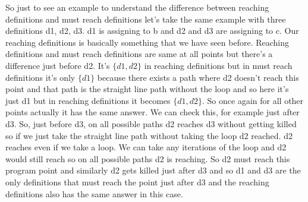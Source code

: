 \begin{figure}[h!]
\begin {center}
\begin{minipage}{.5\textwidth}
\end{minipage}
\end{center}
\end{figure}

So just to see an example to understand the difference between reaching definitions and must reach definitions let's take the same example with three definitions d1, d2, d3. d1 is assigning to b and d2 and d3 are assigning to c. Our reaching definitions is basically
something that we have seen before. Reaching definitions and must reach definitions are same at all points but there's a difference just before d2. It's $\{d1, d2\}$ in reaching definitions but in must reach definitions it's only $\{d1\}$ because there exists a path where d2 doesn't reach this point and that path is the straight line path without the loop and so here it's just d1 but in reaching definitions it becomes $\{d1, d2\}$. So once again for all other points actually it has the same answer. We can check this, for example just after d3. So, just before d3, on all possible paths d2 reaches d3 without getting killed so if we just take the straight line path without taking the loop d2 reached. d2 reaches even if we take a loop. We can take any iterations of the loop and d2 would still reach so on all possible paths d2 is reaching. So d2 must reach this program point and similarly d2 gets killed just after d3 and so d1 and d3 are the only definitions that must reach the point just after d3 and the reaching definitions also has the same answer in this case.